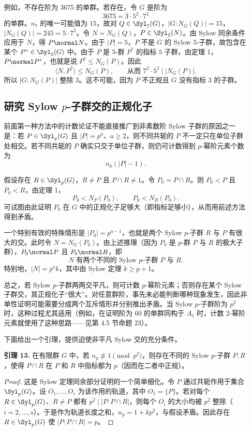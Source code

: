 例如，不存在阶为 $3675$ 的单群。若存在，令 $G$ 是阶为
\[
  3675=3\cdot5^2\cdot7^2
\]
的单群。$n_7$ 的唯一可能值为 $15$，故对 $Q\in\Syl_7(G)$，$|G:N_G(Q)|=15$，$|N_G(Q)|=245=5\cdot7^2$。令 $N=N_G(Q)$，$P\in\Syl_5(N)$。由 Sylow 同余条件应用于 $N$，得 $P\normal N$。由于 $|P|=5$，$P$ 不是 $G$ 的 Sylow $5$-子群，故包含在某个 $P^*\in\Syl_5(G)$ 中。由于 $P$ 是 $5$-群 $P^*$ 的指标 $5$ 子群，由定理 1，$P\normal P^*$，也就是说 $P^*\leq N_G(P)$。因此
\[
  \langle N,P^*\rangle\leq N_G(P),
  \qquad \text{从而 } 7^2\cdot5^2\mid |N_G(P)|.
\]
所以 $|G:N_G(P)|$ 整除 $3$。这不可能，因为 $P$ 不正规且 $G$ 没有指标 $3$ 的子群。

\subsection*{研究 Sylow $p$-子群交的正规化子}

前面第一种方法中的计数论证不能直接推广到非素数阶 Sylow 子群的原因之一是：若 $P\in\Syl_p(G)$ 且 $|P|=p^a$、$a\geq2$，则不同共轭的 $P$ 不一定只在单位子群处相交。若不同共轭的 $P$ 确实只交于单位子群，则仍可计数得到 $p$-幂阶元素个数为
\[
  n_p(|P|-1).
\]

假设存在 $R\in\Syl_p(G)$，$R\neq P$ 且 $P\cap R\neq 1$。令 $P_0=P\cap R$。则 $P_0<P$ 且 $P_0<R$，由定理 1，
\[
  P_0<N_P(P_0),
  \qquad
  P_0<N_R(P_0).
\]
可试图由此证明 $P_0$ 在 $G$ 中的正规化子足够大（即指标足够小），从而用前述方法得到矛盾。

一个特别有效的特殊情形是 $|P_0|=p^{a-1}$，也就是两个 Sylow $p$-子群 $R$ 与 $P$ 有很大的交。此时令 $N=N_G(P_0)$。由上述推理（因为 $P_0$ 是 $p$-群 $P$ 与 $R$ 的极大子群），$P_0\normal P$ 且 $P_0\normal R$，即
\[
  N\text{ 有两个不同的 Sylow }p\text{-子群 }P\text{ 与 }R.
\]
特别地，$|N|=p^a k$，其中由 Sylow 定理 $k\geq p+1$。

总之，若 Sylow $p$-子群两两交平凡，则可计数 $p$-幂阶元素；否则存在某个 Sylow 子群交，其正规化子“很大”。对任意群阶，事先未必能判断哪种现象发生，因此非单性证明可能需要分成两个互斥情形并分别推出矛盾。当 Sylow $p$-子群阶为 $p^2$ 时，这种过程尤其适用（例如，在证明阶为 $60$ 的单群同构于 $A_5$ 时，计数 $2$-幂阶元素就使用了这种思路——见第 4.5 节命题 23）。

下面给出一个引理，提供迫使非平凡 Sylow 交的充分条件。

\medskip
\noindent\textbf{引理 13.} 在有限群 $G$ 中，若 $n_p\not\equiv 1\pmod{p^2}$，则存在不同的 Sylow $p$-子群 $P,R$，使得 $P\cap R$ 在 $P$ 和 $R$ 中指标都为 $p$（因而在二者中正规）。

\begin{proof}
这是 Sylow 定理同余部分证明的一个简单细化。令 $P$ 通过共轭作用于集合 $\Syl_p(G)$。设 $O_1,
\ldots,O_s$ 为该作用的轨道，其中 $O_1=\{P\}$。若对每个 $R\in\Syl_p(G)$、$R\neq P$ 都有 $p^2\mid |P:P\cap R|$，则每个 $O_i$ 的大小均被 $p^2$ 整除（$i=2,
\ldots,s$）。于是作为轨道长度之和，$n_p=1+kp^2$，与假设矛盾。因此存在 $R\in\Syl_p(G)$ 使 $|P:P\cap R|=p$。
\end{proof}

